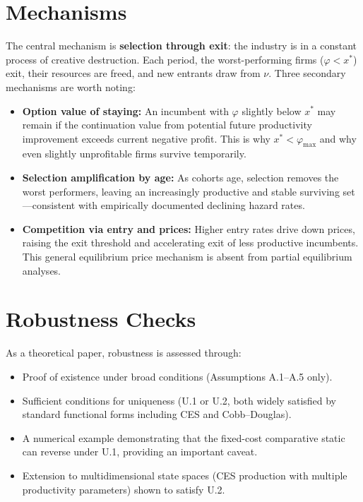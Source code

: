 \section{Mechanisms}

The central mechanism is \textbf{selection through exit}: the industry is in
a constant process of creative destruction. Each period, the worst-performing
firms ($\varphi < x^*$) exit, their resources are freed, and new entrants draw
from $\nu$. Three secondary mechanisms are worth noting:

\begin{itemize}
  \item \textbf{Option value of staying:} An incumbent with $\varphi$ slightly
    below $x^*$ may remain if the continuation value from potential future
    productivity improvement exceeds current negative profit. This is why
    $x^* < \varphi_{\max}$ and why even slightly unprofitable firms survive
    temporarily.
  \item \textbf{Selection amplification by age:} As cohorts age, selection
    removes the worst performers, leaving an increasingly productive and stable
    surviving set---consistent with empirically documented declining hazard rates.
  \item \textbf{Competition via entry and prices:} Higher entry rates drive
    down prices, raising the exit threshold and accelerating exit of less
    productive incumbents. This general equilibrium price mechanism is absent
    from partial equilibrium analyses.
\end{itemize}

\section{Robustness Checks}

As a theoretical paper, robustness is assessed through:
\begin{itemize}
  \item Proof of existence under broad conditions (Assumptions A.1--A.5 only).
  \item Sufficient conditions for uniqueness (U.1 or U.2, both widely
    satisfied by standard functional forms including CES and Cobb--Douglas).
  \item A numerical example demonstrating that the fixed-cost comparative
    static can reverse under U.1, providing an important caveat.
  \item Extension to multidimensional state spaces (CES production with
    multiple productivity parameters) shown to satisfy U.2.
\end{itemize}

